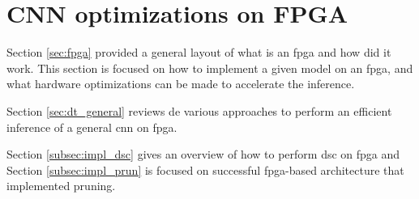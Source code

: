 \section{CNN optimizations on FPGA} \label{sec:opti_dataflow}
%
%
Section \ref{sec:fpga} provided a general layout of what is an \acrshort{fpga} and how did it work. This section is focused on how to implement a given model on an \acrshort{fpga}, and what hardware optimizations can be made to accelerate the inference.

Section \ref{sec:dt_general} reviews de various approaches to perform an efficient inference of a general \acrshort{cnn} on \acrshort{fpga}. 

Section \ref{subsec:impl_dsc} gives an overview of how to perform \acrshort{dsc} on \acrshort{fpga} and Section \ref{subsec:impl_prun} is focused on successful \acrshort{fpga}-based architecture that implemented pruning.
%

%

